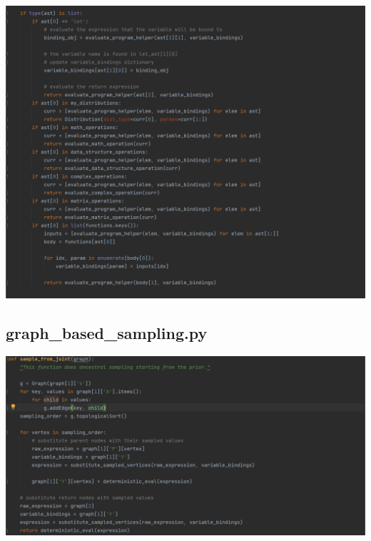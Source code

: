 \documentclass[10pt]{homeworg}
\begin{document}
\begin{center}
\includegraphics[scale=0.5]{figures/evaluate_program_2.png}
\end{center}

\subsection{graph\_based\_sampling.py}

\begin{center}
\includegraphics[scale=0.5]{figures/sample_from_joint.png}
\end{center}
\end{document}
